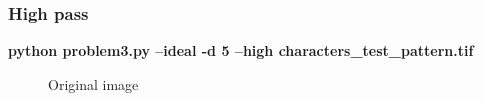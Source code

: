         \pagebreak
        \subsubsection{High pass}

        \small{\textbf{python problem3.py --ideal -d 5 --high characters\_test\_pattern.tif}}

        \begin{figure}[!htb]\centering
            \begin{minipage}{0.40\textwidth}
                \caption{\small{Original image}}
            \end{minipage}
            \begin{minipage}{0.40\textwidth}

\end{minipage}
\end{figure}
